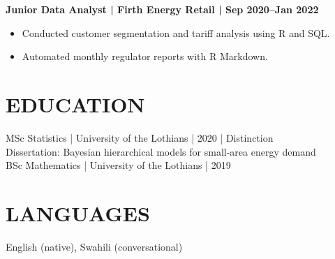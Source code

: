 \documentclass[11pt,a4paper]{article}
\begin{document}
\textbf{Junior Data Analyst | Firth Energy Retail | Sep 2020–Jan 2022}
\begin{itemize}
    \item Conducted customer segmentation and tariff analysis using R and SQL.
    \item Automated monthly regulator reports with R Markdown.
\end{itemize}

\section*{EDUCATION}
MSc Statistics | University of the Lothians | 2020 | Distinction\\
Dissertation: Bayesian hierarchical models for small-area energy demand\\
BSc Mathematics | University of the Lothians | 2019

\section*{LANGUAGES}
English (native), Swahili (conversational)
\end{document}
